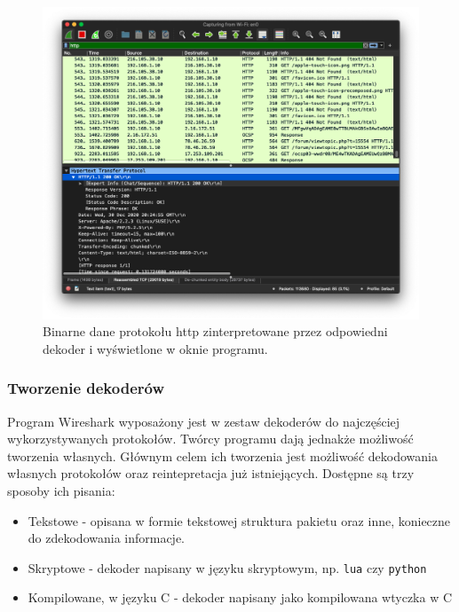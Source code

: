\documentclass[a4paper, 12pt, twoside, openright]{article}
\begin{document}
	\begin{figure}[h]
		\centering
			\includegraphics[width=1.0\textwidth]{img/screenshot_fis_http.png}
		\caption{Binarne dane protokołu http zinterpretowane przez odpowiedni dekoder i wyświetlone w oknie programu.}
		\label{fig:fis_http}
	\end{figure}

\newpage

\subsubsection{Tworzenie dekoderów}

	\indent\par
	Program Wireshark wyposażony jest w zestaw dekoderów do najczęściej wykorzystywanych protokołów. Twórcy programu
	dają jednakże możliwość tworzenia własnych. Głównym celem ich tworzenia jest możliwość
	dekodowania własnych protokołów oraz reintepretacja już istniejących. Dostępne są trzy sposoby ich pisania:
	\begin{itemize}
		\item Tekstowe - opisana w formie tekstowej struktura pakietu oraz inne, konieczne do zdekodowania informacje.
		\item Skryptowe - dekoder napisany w języku skryptowym, np. \texttt{lua} czy \texttt{python}
		\item Kompilowane, w języku C - dekoder napisany jako kompilowana wtyczka w C
	\end{itemize}
\end{document}
